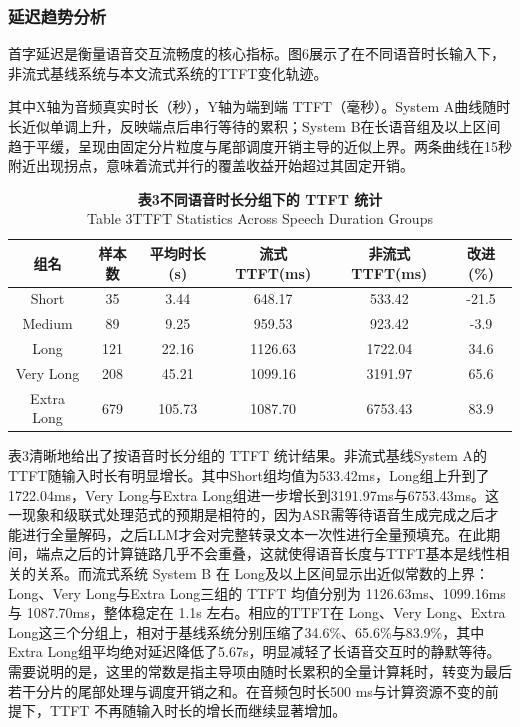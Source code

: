 \documentclass[UTF8,a4paper,zihao=5]{ctexart}
\begin{document}
\subsubsection{延迟趋势分析}

首字延迟是衡量语音交互流畅度的核心指标。图6展示了在不同语音时长输入下，非流式基线系统与本文流式系统的TTFT变化轨迹。

其中X轴为音频真实时长（秒），Y轴为端到端 TTFT（毫秒）。System A曲线随时长近似单调上升，反映端点后串行等待的累积；System B在长语音组及以上区间趋于平缓，呈现由固定分片粒度与尾部调度开销主导的近似上界。两条曲线在15秒附近出现拐点，意味着流式并行的覆盖收益开始超过其固定开销。

\begin{table}[htbp]
\centering
\caption*{\textbf{表3\quad 不同语音时长分组下的 TTFT 统计}\\
Table 3\quad TTFT Statistics Across Speech Duration Groups}
\begin{tabular}{cccccc}
\toprule
组名 & 样本数 & 平均时长(s) & 流式TTFT(ms) & 非流式TTFT(ms) & 改进(\%) \\
\midrule
Short & 35 & 3.44 & 648.17 & 533.42 & -21.5 \\
Medium & 89 & 9.25 & 959.53 & 923.42 & -3.9 \\
Long & 121 & 22.16 & 1126.63 & 1722.04 & 34.6 \\
Very Long & 208 & 45.21 & 1099.16 & 3191.97 & 65.6 \\
Extra Long & 679 & 105.73 & 1087.70 & 6753.43 & 83.9 \\
\bottomrule
\end{tabular}
\end{table}

表3清晰地给出了按语音时长分组的 TTFT 统计结果。非流式基线System A的TTFT随输入时长有明显增长。其中Short组均值为533.42ms，Long组上升到了1722.04ms，Very Long与Extra Long组进一步增长到3191.97ms与6753.43ms。这一现象和级联式处理范式的预期是相符的，因为ASR需等待语音生成完成之后才能进行全量解码，之后LLM才会对完整转录文本一次性进行全量预填充。在此期间，端点之后的计算链路几乎不会重叠，这就使得语音长度与TTFT基本是线性相关的关系。而流式系统 System B 在 Long及以上区间显示出近似常数的上界：Long、Very Long与Extra Long三组的 TTFT 均值分别为 1126.63ms、1099.16ms 与 1087.70ms，整体稳定在 1.1s 左右。相应的TTFT在 Long、Very Long、Extra Long这三个分组上，相对于基线系统分别压缩了34.6\%、65.6\%与83.9\%，其中Extra Long组平均绝对延迟降低了5.67s，明显减轻了长语音交互时的静默等待。需要说明的是，这里的常数是指主导项由随时长累积的全量计算耗时，转变为最后若干分片的尾部处理与调度开销之和。在音频包时长500 ms与计算资源不变的前提下，TTFT 不再随输入时长的增长而继续显著增加。
\end{document}
